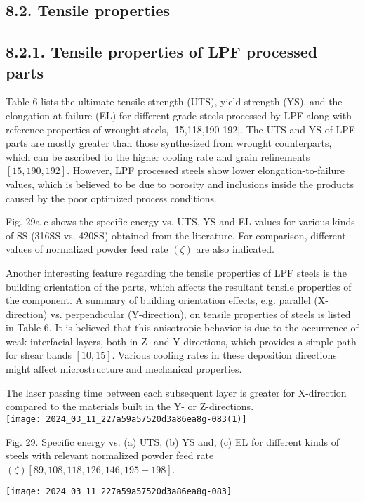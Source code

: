 \documentclass[10pt]{article}
\begin{document}
\subsection*{8.2. Tensile properties}
\subsection*{8.2.1. Tensile properties of LPF processed parts}
Table 6 lists the ultimate tensile strength (UTS), yield strength (YS), and the elongation at failure (EL) for different grade steels processed by LPF along with reference properties of wrought steels, [15,118,190-192]. The UTS and YS of LPF parts are mostly greater than those synthesized from wrought counterparts, which can be ascribed to the higher cooling rate and grain refinements $[15,190,192]$. However, LPF processed steels show lower elongation-to-failure values, which is believed to be due to porosity and inclusions inside the products caused by the poor optimized process conditions.

Fig. 29a-c shows the specific energy vs. UTS, YS and EL values for various kinds of SS (316SS vs. 420SS) obtained from the literature. For comparison, different values of normalized powder feed rate $(\zeta)$ are also indicated.

Another interesting feature regarding the tensile properties of LPF steels is the building orientation of the parts, which affects the resultant tensile properties of the component. A summary of building orientation effects, e.g. parallel (X-direction) vs. perpendicular (Y-direction), on tensile properties of steels is listed in Table 6. It is believed that this anisotropic behavior is due to the occurrence of weak interfacial layers, both in Z- and Y-directions, which provides a simple path for shear bands $[10,15]$. Various cooling rates in these deposition directions might affect microstructure and mechanical properties.

The laser passing time between each subsequent layer is greater for X-direction compared to the materials built in the Y- or Z-directions.\\
\texttt{[image: 2024\_03\_11\_227a59a57520d3a86ea8g-083(1)]}

Fig. 29. Specific energy vs. (a) UTS, (b) YS and, (c) EL for different kinds of steels with relevant normalized powder feed rate $(\zeta)[89,108,118,126,146,195-198]$.

\begin{center}
\texttt{[image: 2024\_03\_11\_227a59a57520d3a86ea8g-083]}
\end{center}
\end{document}
